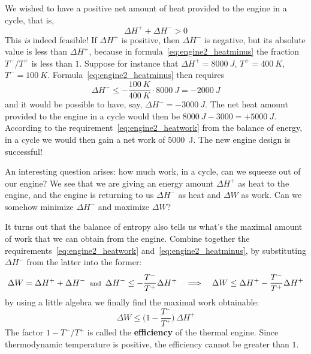 \documentclass[a4paper,12pt,%
onecolumn,oneside,titlepage,%
british%
]{memoir}
\newcommand*{\incr}{\Delta}%
\renewcommand*{\|}[1][]{\nonscript\:#1\vert\nonscript\:\mathopen{}}
\newcommand*{\yhep}{\incr H^{+}}%
\newcommand*{\yhem}{\incr H^{-}}%
\newcommand*{\yW}{\incr W}%
\newcommand*{\yT}{T}%
\newcommand*{\yTp}{\yT^{+}}%
\newcommand*{\yTm}{\yT^{-}}%
\begin{document}
We wished to have a positive net amount of heat provided to the engine in a cycle, that is,
\begin{equation*}
  \yhep + \yhem > 0
\end{equation*}
This \emph{is} indeed feasible! If $\yhep$ is positive, then $\yhem$ is negative, but its absolute value is less than $\yhep$, because in formula~\eqref{eq:engine2_heatminus} the fraction $\yTm/\yTp$ is less than $1$. Suppose for instance that $\yhep=\qty{8000}{J}$, $\yTp=\qty{400}{K}$, $\yTm=\qty{100}{K}$. Formula~\eqref{eq:engine2_heatminus} then requires
\begin{equation*}
  \yhem \le -\frac{\qty{100}{K}}{\qty{400}{K}}\cdot\qty{8000}{J} = -\qty{2000}{J}
\end{equation*}
and it would be possible to have, say, $\yhem=-\qty{3000}{J}$. The net heat amount provided to the engine in a cycle would then be $\qty{8000}{J}-\qty{3000} = +\qty{5000}{J}$. According to the requirement~\eqref{eq:engine2_heatwork} from the balance of energy, in a cycle we would then gain a net work of \qty{5000}{J}. The new engine design is successful!

\medskip

An interesting question arises: how much work, in a cycle, can we squeeze out of our engine? We see that we are giving an energy amount $\yhep$ as heat to the engine, and the engine is returning to us $\yhem$ as heat and $\yW$ as work. Can we somehow minimize $\yhem$ and maximize $\yW$?

It turns out that the balance of entropy also tells us what's the maximal amount of work that we can obtain from the engine. Combine together the requirements~\eqref{eq:engine2_heatwork} and~\eqref{eq:engine2_heatminus}, by substituting $\yhem$ from the latter into the former:
\begin{equation*}
  \yW = \yhep + \yhem
  \enspace\text{\footnotesize and}\enspace
  \yhem \le -\frac{\yTm}{\yTp}\yhep
\quad\Longrightarrow\quad
  \yW \le \yhep -\frac{\yTm}{\yTp}\yhep
\end{equation*}
by using a little algebra we finally find the maximal work obtainable:
\begin{equation}\label{eq:thermal_efficiency}
  \yW \le \biggl(1-\frac{\yTm}{\yTp}\biggr)\,\yhep
\end{equation}
The factor $1-\yTm/\yTp$ is called the \textbf{efficiency} of the thermal engine. Since thermodynamic temperature is positive, the efficiency cannot be greater than $1$.
\end{document}
